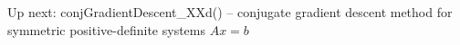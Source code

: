 
\begin{DoxyRefList}
\item[\label{todo__todo000001}%
\Hypertarget{todo__todo000001}%
Namespace \mbox{\hyperlink{namespaceopt}{opt}} ]Up next\+: conj\+Gradient\+Descent\+\_\+\+X\+Xd() -- conjugate gradient descent method for symmetric positive-\/definite systems $Ax=b$ 
\end{DoxyRefList}
